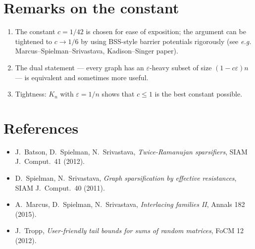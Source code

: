 \section{Remarks on the constant}

\begin{enumerate}
\item The constant $c=1/42$ is chosen for ease of exposition; the argument can be tightened to $c\to 1/6$ by using BSS-style barrier potentials rigorously (see \emph{e.g.} Marcus--Spielman--Srivastava, Kadison--Singer paper).
\item The dual statement --- every graph has an $\varepsilon$-heavy subset of size $(1-c\varepsilon)n$ --- is equivalent and sometimes more useful.
\item Tightness: $K_n$ with $\varepsilon=1/n$ shows that $c\leq 1$ is the best constant possible.
\end{enumerate}

\section*{References}
\begin{itemize}\setlength\itemsep{0.2em}
\item J.~Batson, D.~Spielman, N.~Srivastava, \emph{Twice-Ramanujan sparsifiers}, SIAM J.~Comput.\ 41 (2012).
\item D.~Spielman, N.~Srivastava, \emph{Graph sparsification by effective resistances}, SIAM J.~Comput.\ 40 (2011).
\item A.~Marcus, D.~Spielman, N.~Srivastava, \emph{Interlacing families II}, Annals 182 (2015).
\item J.~Tropp, \emph{User-friendly tail bounds for sums of random matrices}, FoCM 12 (2012).
\end{itemize}


